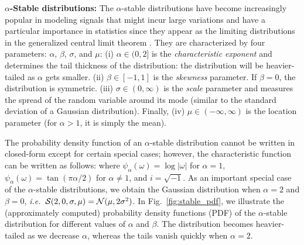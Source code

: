 

\textbf{$\alpha$-Stable distributions:} 
The $\alpha$-stable distributions have become increasingly popular in modeling signals that might incur large variations \cite{kuruoglu1999signal, mandelbrot2013fractals,simsekli2015alpha,wang2016delving,leglaive:hal-01416366} and have a particular importance in statistics since they appear as the limiting distributions in the generalized central limit theorem \cite{samorodnitsky1994stable}. They are characterized by four parameters: $\alpha$, $\beta$, $\sigma$, and $\mu$:
%
(i) $\alpha \in (0,2]$ is the \emph{characteristic exponent} and determines the tail thickness of the distribution: the distribution will be heavier-tailed as $\alpha$ gets smaller. 
(ii) $\beta \in [-1 ,1]$ is the \emph{skewness} parameter.
If $\beta = 0$, the distribution is symmetric.
(iii) $\sigma \in (0,\infty)$ is the \emph{scale} parameter and measures the spread of the random variable around its mode (similar to the standard deviation of a Gaussian distribution). Finally, (iv) $\mu \in (-\infty, \infty)$ is the location parameter (for $\alpha > 1$, it is simply the mean). 

The probability density function of an $\alpha$-stable distribution cannot be written in closed-form except for certain special cases; however, the characteristic function  can be written as follows:
where $\psi_\alpha(\omega) = \log |\omega| $ for $\alpha =1$, $\psi_\alpha(\omega) = \tan(\pi \alpha/2)$ for $\alpha \neq 1$, and $i = \sqrt{-1}$. 
%
As an important special case of the $\alpha$-stable distributions, we obtain the Gaussian distribution when $\alpha = 2$ and $\beta =0$, \textit{i.e.}\ ${\cal S}(2,0,\sigma,\mu) = {\cal N}(\mu,2 \sigma^2)$. 
%
In Fig.~\ref{fig:stable_pdf}, we illustrate the (approximately computed) probability density functions (PDF) of the $\alpha$-stable distribution for different values of $\alpha$ and $\beta$. The distribution becomes heavier-tailed as we decrease $\alpha$, whereas the tails vanish quickly when $\alpha=2$. 


